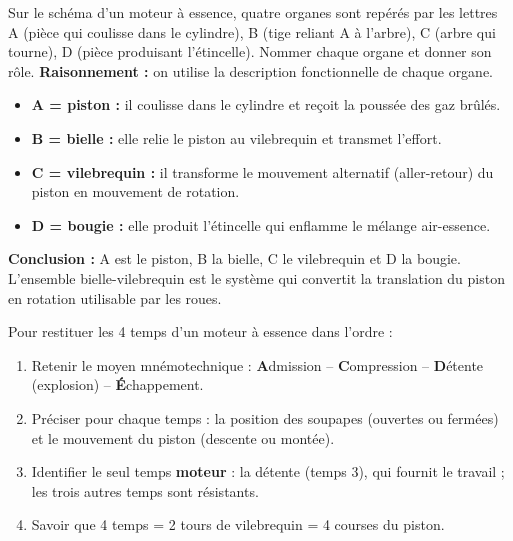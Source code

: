 \documentclass[11pt]{article}
\begin{document}
\begin{exoresolu}
Sur le schéma d'un moteur à essence, quatre organes sont repérés par les lettres A (pièce qui coulisse dans le cylindre), B (tige reliant A à l'arbre), C (arbre qui tourne), D (pièce produisant l'étincelle). Nommer chaque organe et donner son rôle.
\tcblower
\textbf{Raisonnement :} on utilise la description fonctionnelle de chaque organe.
\begin{itemize}
\item \textbf{A = piston :} il coulisse dans le cylindre et reçoit la poussée des gaz brûlés.
\item \textbf{B = bielle :} elle relie le piston au vilebrequin et transmet l'effort.
\item \textbf{C = vilebrequin :} il transforme le mouvement alternatif (aller-retour) du piston en mouvement de rotation.
\item \textbf{D = bougie :} elle produit l'étincelle qui enflamme le mélange air-essence.
\end{itemize}
\textbf{Conclusion :} A est le piston, B la bielle, C le vilebrequin et D la bougie. L'ensemble bielle-vilebrequin est le système qui convertit la translation du piston en rotation utilisable par les roues.
\end{exoresolu}

\begin{methode}
Pour restituer les 4 temps d'un moteur à essence dans l'ordre :
\begin{enumerate}
\item Retenir le moyen mnémotechnique : \textbf{A}dmission – \textbf{C}ompression – \textbf{D}étente (explosion) – \textbf{É}chappement.
\item Préciser pour chaque temps : la position des soupapes (ouvertes ou fermées) et le mouvement du piston (descente ou montée).
\item Identifier le seul temps \textbf{moteur} : la détente (temps 3), qui fournit le travail ; les trois autres temps sont résistants.
\item Savoir que 4 temps = 2 tours de vilebrequin = 4 courses du piston.
\end{enumerate}
\end{methode}
\end{document}
